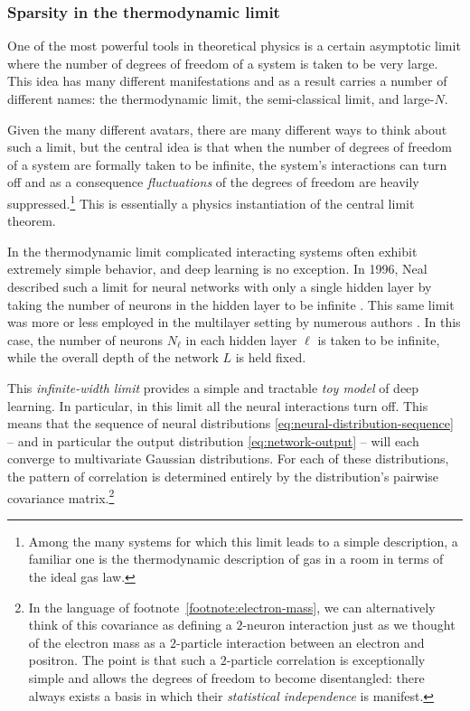 \documentclass[12pt]{article}
\begin{document}
\subsubsection*{Sparsity in the thermodynamic limit} %


One of the most powerful tools in theoretical physics is a certain asymptotic limit where the number of degrees of freedom of a system is taken to be very large. 
This idea has many different manifestations and as a result carries a number of different names: the thermodynamic limit, the semi-classical limit, and large-$N$. %

Given the many different avatars, there are many different ways to think about such a limit, but the central idea is that when the number of degrees of freedom of a system are formally taken to be infinite, the system's interactions can turn off 
and 
as a consequence
\emph{fluctuations} of the degrees of freedom are heavily suppressed.\footnote{
    Among the many systems for which this limit leads to a simple description, a familiar one is the thermodynamic description of gas in a room in terms of the ideal gas law.
}
This is essentially a physics instantiation of the central limit theorem.

In the thermodynamic limit complicated interacting systems often exhibit extremely simple behavior, and deep learning is no exception. In 1996, Neal described such a limit for neural networks with only a single hidden layer by taking the number of neurons in the hidden layer to be infinite \cite{neal1996priors}. 
This same limit was more or less employed in the multilayer setting by numerous authors \cite{poole2016exponential,raghu2017expressive, schoenholz2016deep,lee2018deep,g2018gaussian,jacot2018neural}. In this case, the number of neurons $N_\ell$ in each hidden layer $\ell$ is taken to be infinite, while the overall depth of the network $L$ is held fixed.









This \emph{infinite-width limit} provides a simple and tractable \emph{toy model} of deep learning. In particular, in this limit all the neural interactions turn off. 
This means that  the sequence of neural distributions \eqref{eq:neural-distribution-sequence} -- and in particular the output distribution \eqref{eq:network-output} -- will each converge to multivariate Gaussian distributions.
For each of these distributions, the pattern of correlation is determined entirely by the distribution's pairwise covariance matrix.\footnote{
    In the language of footnote~\ref{footnote:electron-mass}, we can alternatively think of this covariance as defining a $2$-neuron interaction just as we thought of the electron mass as a $2$-particle interaction between an electron and positron. The point is that such a $2$-particle correlation is exceptionally simple and allows the degrees of freedom to become disentangled: there always exists a basis in which their \emph{statistical independence} is manifest.
}
\end{document}
